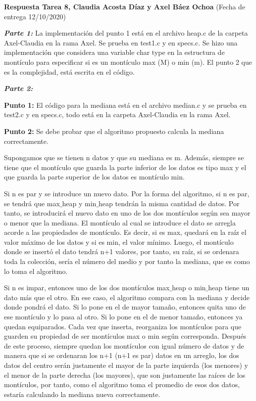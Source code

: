 \documentclass[]{report}
\begin{document}
\textbf{Respuesta Tarea 8, Claudia Acosta Díaz y Axel Báez Ochoa} (Fecha de entrega 12/10/2020) \newline
	
\textbf{\textit{Parte 1:}}\newline
La implementación del punto 1 está en el archivo heap.c de la carpeta Axel-Claudia en la rama Axel. Se prueba en test1.c y en specs.c. Se hizo una implementación que considera una variable char type en la estructura de montículo para especificar si es un montículo max (M) o min (m).  El punto 2 que es la complejidad, está escrita en el código. \newline

\textbf{\textit{Parte 2:}}\newline

\textbf{Punto 1:} El código para la mediana está en el archivo median.c y se prueba en test2.c y en specs.c, todo está en la carpeta  Axel-Claudia en la rama Axel.\newline

\textbf{Punto 2:} Se debe probar que el algoritmo propuesto calcula la mediana correctamente. \newline

Supongamos que se tienen n datos y que su mediana es m. Además, siempre se tiene que el montículo que guarda la parte inferior de los datos es tipo max y el que guarda la parte superior de los datos es montículo min. \newline

Si n es par y se introduce un nuevo dato. Por la forma del algoritmo, si n es par, se tendrá que max$\_$heap y min$\_$heap tendrán la misma cantidad de datos. Por tanto, se introducirá el nuevo dato en uno de los dos montículos según sea mayor o menor que la mediana. El montículo al cual se introduce el dato se arregla acorde a las propiedades de montículo. Es decir, si es max, quedará en la raíz el valor máximo de los datos y si es min, el valor mínimo. Luego, el montículo donde se insertó el dato tendrá n+1 valores, por tanto, su raíz, si se ordenara toda la colección, sería el número del medio y por tanto la mediana, que es como lo toma el algoritmo. \newline

Si n es impar, entonces uno de los dos montículos max$\_$heap o min$\_$heap tiene un dato más que el otro. En ese caso, el algoritmo compara con la mediana y decide donde pondrá el dato. Si lo pone en el de mayor tamaño, entonces quita uno de ese montículo y lo pasa al otro. Si lo pone en el de menor tamaño, entonces ya quedan equiparados. Cada vez que inserta, reorganiza los montículos para que guarden su propiedad de ser montículos max o min según corresponda. Después de este proceso, siempre quedan los montículos con igual número de datos y de manera que si se ordenaran los n+1 (n+1 es par) datos en un arreglo, los dos datos del centro serán justamente el mayor de la parte izquierda (los menores) y el menor de la parte derecha (los mayores), que son justamente las raíces de los montículos, por tanto, como el algoritmo toma el promedio de esos dos datos, estaría calculando la mediana  nueva correctamente. \newline
\end{document}
